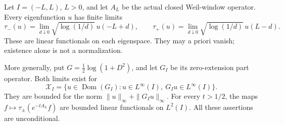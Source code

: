 \begin{theorem}
\label{AC-S37}
Let \(I=(-L,L)\), \(L>0\), and let \(A_L\) be the actual closed
Weil-window operator.  Every eigenfunction \(u\) has finite limits
\[
 \tau_-(u)=\lim_{d\downarrow0}\sqrt{\log(1/d)}\,u(-L+d),
 \qquad
 \tau_+(u)=\lim_{d\downarrow0}\sqrt{\log(1/d)}\,u(L-d).
                                                        \tag{RN.1}
\]
These are linear functionals on each eigenspace.  They may a priori
vanish; existence alone is not a normalization.

More generally, put \(G=\tfrac12\log(1+D^2)\), and let \(G_I\)
be its zero-extension part operator.  Both limits exist for
\[
 \mathcal X_I=\{u\in\operatorname{Dom}(G_I):
                      u\in L^\infty(I),\ G_Iu\in L^\infty(I)\}.
                                                        \tag{RN.2}
\]
They are bounded for the norm
\(\|u\|_\infty+\|G_Iu\|_\infty\).
For every \(t>1/2\), the maps
\(f\mapsto\tau_\pm(e^{-tA_L}f)\) are bounded linear functionals
on \(L^2(I)\).  All these assertions are unconditional.
\end{theorem}
